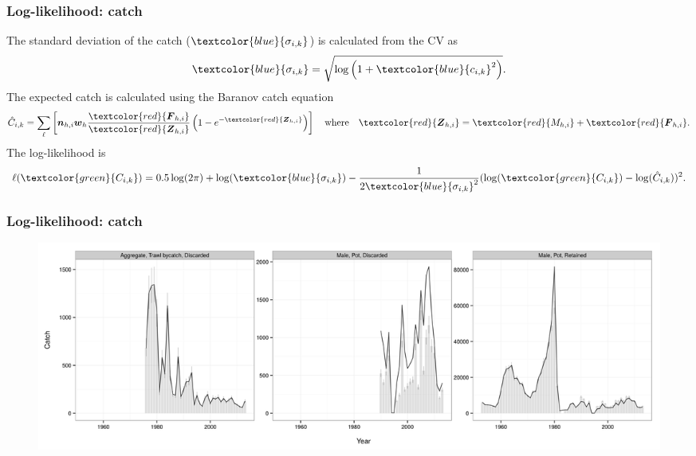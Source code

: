 \documentclass{beamer}
\begin{document}

\begin{frame}
\frametitle{Log-likelihood: catch}
The standard deviation of the catch ($\textcolor{blue}{\sigma_{i,k}}$) is calculated
from the CV as
\begin{equation*}
  \textcolor{blue}{\sigma_{i,k}} = \sqrt{\log \left( 1+\textcolor{blue}{c_{i,k}}^2 \right)}.
\end{equation*}
The expected catch is calculated using the Baranov catch equation
\begin{equation*}
  \hat{C}_{i,k} = \sum_{\ell} \left[ \boldsymbol{n}_{h,i} \boldsymbol{w}_{h}
    \frac{\textcolor{red}{\boldsymbol{F}_{h,i}}}{\textcolor{red}{\boldsymbol{Z}_{h,i}}} 
    \left( 1 - e^{-\textcolor{red}{\boldsymbol{Z}_{h,i}}} \right) \right] \quad \text{where}
  \quad \textcolor{red}{\boldsymbol{Z}_{h,i}}
  = \textcolor{red}{M_{h,i}} + \textcolor{red}{\boldsymbol{F}_{h,i}}.
\end{equation*}
The log-likelihood is
\begin{equation*}
  \ell(\textcolor{green}{C_{i,k}}) = 0.5 \log (2 \pi) + \log
  (\textcolor{blue}{\sigma_{i,k}}) -
  \frac{1}{2\textcolor{blue}{\sigma_{i,k}}^2} (\log (\textcolor{green}{C_{i,k}})
  - \log (\hat{C}_{i,k}))^2.
\end{equation*}
\end{frame}


\begin{frame}
\frametitle{Log-likelihood: catch}
\begin{figure}[!htbp]
  \centering
  \includegraphics[width=\linewidth]{../../examples/bbrkc/OneSex/figure/catch.png}
\end{figure}
\end{frame}

\end{document}
